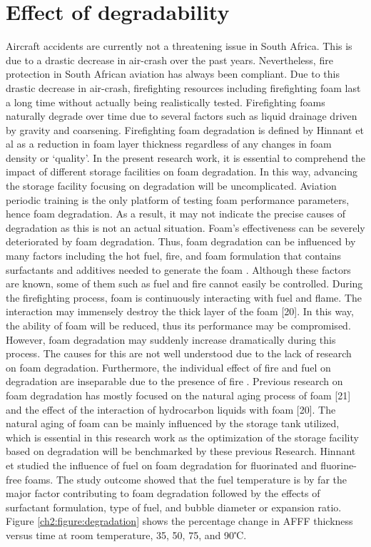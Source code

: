 \documentclass[12pt]{report}
\begin{document}
\section{Effect of degradability}
Aircraft accidents are currently not a threatening issue in South Africa. This is due to a drastic decrease in air-crash over the past years. Nevertheless, fire protection in South African aviation has always been compliant. Due to this drastic decrease in air-crash, firefighting resources including firefighting foam last a long time without actually being realistically tested. Firefighting foams naturally degrade over time due to several factors such as liquid drainage driven by gravity and coarsening. Firefighting foam degradation is defined by Hinnant et al \cite{hinnant2017influence} as a reduction in foam layer thickness regardless of any changes in foam density or ‘quality’.
In the present research work, it is essential to comprehend the impact of different storage facilities on foam degradation. In this way, advancing the storage facility focusing on degradation will be uncomplicated. Aviation periodic training is the only platform of testing foam performance parameters, hence foam degradation. As a result, it may not indicate the precise causes of degradation as this is not an actual situation. Foam’s effectiveness can be severely deteriorated by foam degradation. Thus, foam degradation can be influenced by many factors including the hot fuel, fire, and foam formulation that contains surfactants and additives needed to generate the foam \cite{hinnant2017influence}. Although these factors are known, some of them such as fuel and fire cannot easily be controlled.    
During the firefighting process, foam is continuously interacting with fuel and flame. The interaction may immensely destroy the thick layer of the foam [20]. In this way, the ability of foam will be reduced, thus its performance may be compromised. However, foam degradation may suddenly increase dramatically during this process.  The causes for this are not well understood due to the lack of research on foam degradation. Furthermore, the individual effect of fire and fuel on degradation are inseparable due to the presence of fire \cite{hinnant2017influence}. 
Previous research on foam degradation has mostly focused on the natural aging process of foam [21] and the effect of the interaction of hydrocarbon liquids with foam [20].  The natural aging of foam can be mainly influenced by the storage tank utilized, which is essential in this research work as the optimization of the storage facility based on degradation will be benchmarked by these previous Research. Hinnant et \cite{hinnant2017influence} studied the influence of fuel on foam degradation for fluorinated and fluorine-free foams. The study outcome showed that the fuel temperature is by far the major factor contributing to foam degradation followed by the effects of surfactant formulation, type of fuel, and bubble diameter or expansion ratio. Figure \ref{ch2:figure:degradation} shows the percentage change in AFFF thickness versus time at room temperature, 35, 50, 75, and 90℃.
\end{document}
